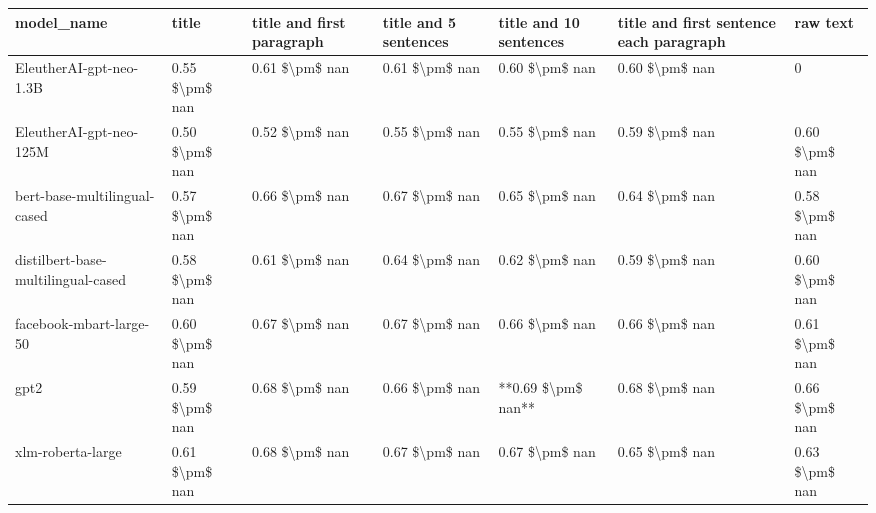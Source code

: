 \begin{tabular}{lllllll}
\toprule
                        model\_name &          title & title and first paragraph & title and 5 sentences & title and 10 sentences & title and first sentence each paragraph &       raw text \\
\midrule
           EleutherAI-gpt-neo-1.3B & 0.55 \$\textbackslash pm\$ nan &            0.61 \$\textbackslash pm\$ nan &        0.61 \$\textbackslash pm\$ nan &         0.60 \$\textbackslash pm\$ nan &                          0.60 \$\textbackslash pm\$ nan &              0 \\
           EleutherAI-gpt-neo-125M & 0.50 \$\textbackslash pm\$ nan &            0.52 \$\textbackslash pm\$ nan &        0.55 \$\textbackslash pm\$ nan &         0.55 \$\textbackslash pm\$ nan &                          0.59 \$\textbackslash pm\$ nan & 0.60 \$\textbackslash pm\$ nan \\
      bert-base-multilingual-cased & 0.57 \$\textbackslash pm\$ nan &            0.66 \$\textbackslash pm\$ nan &        0.67 \$\textbackslash pm\$ nan &         0.65 \$\textbackslash pm\$ nan &                          0.64 \$\textbackslash pm\$ nan & 0.58 \$\textbackslash pm\$ nan \\
distilbert-base-multilingual-cased & 0.58 \$\textbackslash pm\$ nan &            0.61 \$\textbackslash pm\$ nan &        0.64 \$\textbackslash pm\$ nan &         0.62 \$\textbackslash pm\$ nan &                          0.59 \$\textbackslash pm\$ nan & 0.60 \$\textbackslash pm\$ nan \\
           facebook-mbart-large-50 & 0.60 \$\textbackslash pm\$ nan &            0.67 \$\textbackslash pm\$ nan &        0.67 \$\textbackslash pm\$ nan &         0.66 \$\textbackslash pm\$ nan &                          0.66 \$\textbackslash pm\$ nan & 0.61 \$\textbackslash pm\$ nan \\
                              gpt2 & 0.59 \$\textbackslash pm\$ nan &            0.68 \$\textbackslash pm\$ nan &        0.66 \$\textbackslash pm\$ nan &     **0.69 \$\textbackslash pm\$ nan** &                          0.68 \$\textbackslash pm\$ nan & 0.66 \$\textbackslash pm\$ nan \\
                 xlm-roberta-large & 0.61 \$\textbackslash pm\$ nan &            0.68 \$\textbackslash pm\$ nan &        0.67 \$\textbackslash pm\$ nan &         0.67 \$\textbackslash pm\$ nan &                          0.65 \$\textbackslash pm\$ nan & 0.63 \$\textbackslash pm\$ nan \\
\bottomrule
\end{tabular}
